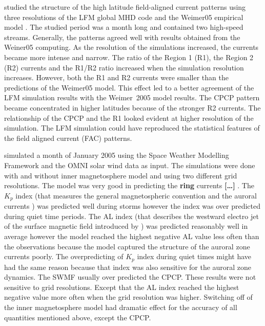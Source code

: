 \documentclass[linenumbers,draft]{agujournal}
\begin{document}
\citet{wiltberger17:_struc_high_latit_curren_magnet_ionos_model} studied the structure of the high latitude field-aligned current patterns using three resolutions of the LFM global MHD code and the Weimer05 empirical model \citep{weimer05:_improv_joule}. The studied period was a month long and contained two high-speed streams. Generally, the patterns agreed well with results obtained from the Weiner05 computing. As the resolution of the simulations increased, the currents became more intense and narrow. The ratio of the Region 1 (R1), the Region 2 (R2) currents and the R1/R2 ratio increased when the simulation resolution increases. However, both the R1 and R2 currents were smaller than the predictions of the Weimer05 model. This effect led to a better agreement of the LFM simulation results with the Weimer~2005 model results. The CPCP pattern became concentrated in higher latitudes because of the stronger R2 currents. The relationship of the CPCP and the R1 looked evident at higher resolution of the simulation. The LFM simulation could have reproduced the statistical features of the field aligned current (FAC) patterns. 

\citet{haiducek17:_swmf_global_magnet_simul_januar} simulated a month of January 2005 using the Space Weather Modelling Framework \citep[SWMF;][]{toth05:_space_weath_model_framew} and the OMNI solar wind data as input. The simulations were done with and without inner magnetosphere model and using two different grid resolutions. The model was very good in predicting the \textbf{ring} currents \textbf{[\dots]} \citep[SYM-H; http://wdc.kugi.kyoto-u.ac.jp/aeasy/asy.pdf;][]{iyemori90:_storm}. The $K_p$ index (that measures the general magnetospheric convention and the auroral currents \citep{bartels39,rostoker72:_geomag,thomsen04:_why_kp}) was predicted well during storms however the index was over predicted during quiet time periods. The AL index (that describes the westward electro jet of the surface magnetic field introduced by \citet{davis66:_auror_ae}) was predicted reasonably well in average however the model reached the highest negative AL value less often than the observations because the model captured the structure of the auroral zone currents poorly. The overpredicting of $K_p$ index during quiet times might have had the same reason because that index was also sensitive for the auroral zone dynamics. The SWMF usually over predicted the CPCP. These results were not sensitive to grid resolutions. Except that the AL index reached the highest negative value more often when the grid resolution was higher. Switching off of the inner magnetosphere model had dramatic effect for the accuracy of all quantities mentioned above, except the CPCP. 
\end{document}
